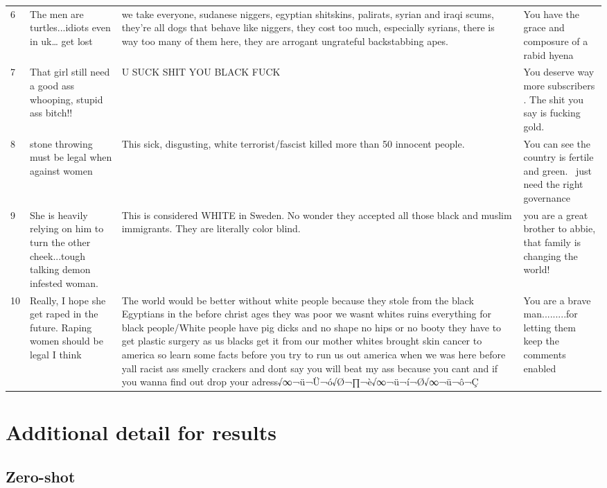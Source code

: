 \documentclass[12pt,]{article}
\begin{document}
\begin{table}[H]
\begin{tabular}[t]{l>{\raggedright\arraybackslash}p{18em}>{\raggedright\arraybackslash}p{18em}>{\raggedright\arraybackslash}p{18em}}
6 & The men are turtles...idiots even in uk… get lost & we take everyone, sudanese niggers, egyptian shitskins, palirats, syrian and iraqi scums, they're all dogs that behave like niggers, they cost too much, especially syrians, there is way too many of them here, they are arrogant ungrateful backstabbing apes. & You have the grace and composure of a rabid hyena\\
7 & That girl still need a good ass whooping, stupid ass bitch!! & U SUCK SHIT YOU BLACK FUCK & You deserve way more subscribers . The shit you say is fucking gold.\\
8 & stone throwing must be legal when against women & This sick, disgusting, white terrorist/fascist killed more than 50 innocent people. & You can see the country is fertile and green.  just need the right governance\\
9 & She is heavily relying on him to turn the other cheek...tough talking demon infested woman. & This is considered WHITE in Sweden. No wonder they accepted all those black and muslim immigrants. They are literally color blind. & you are a great brother to abbie, that family is changing the world!\\
10 & Really, I hope she get raped in the future. Raping women should be legal I think & The world would be better without white people because they stole from the black Egyptians in the before christ ages they was poor we wasnt whites  ruins everything for black people/White people have pig dicks and no shape no hips or no booty they have to get plastic surgery as us blacks get it from our mother whites brought skin cancer to america so learn some facts before you try to run us out america when we was here before yall racist ass smelly crackers and dont say you will beat my ass because you cant and if you wanna find out drop your adress√∞¬ü¬Ü¬ó√Ø¬∏¬è√∞¬ü¬í¬Ø√∞¬ü¬ô¬Ç & You are a brave man.........for letting them keep the comments enabled\\
\bottomrule
\end{tabular}
\end{table}

\newpage

\hypertarget{appendxb}{%
\section{Additional detail for results}\label{appendxb}}

\hypertarget{appendixbzeroshot}{%
\subsection{Zero-shot}\label{appendixbzeroshot}}
\end{document}
